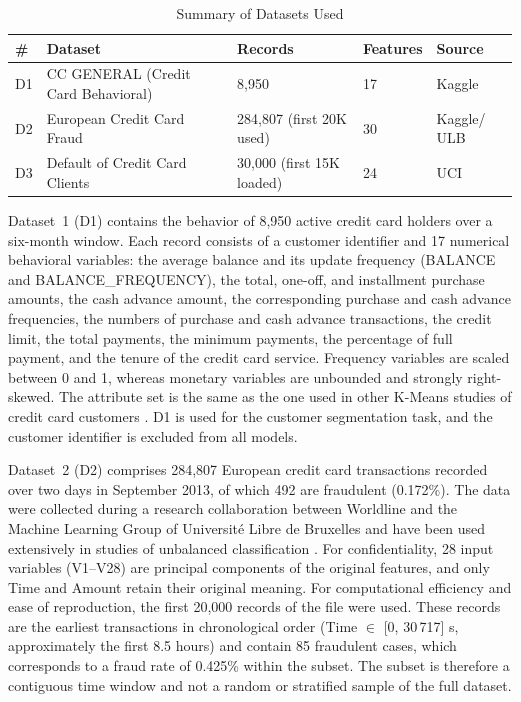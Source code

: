 \documentclass[conference]{IEEEtran}
\begin{document}
\begin{table}[!t]
\centering
\caption{Summary of Datasets Used}
\label{tab:datasets}
\renewcommand{\arraystretch}{1.2}
\begin{tabular}{|p{0.5cm}|p{2.8cm}|p{1.2cm}|p{1cm}|p{1.2cm}|}
\hline
\textbf{\#} & \textbf{Dataset} & \textbf{Records} & \textbf{Features} & \textbf{Source} \\
\hline
D1 & CC GENERAL (Credit Card Behavioral) & 8,950 & 17 & Kaggle \cite{kaggle_ccgeneral} \\
\hline
D2 & European Credit Card Fraud & 284,807 (first 20K used) & 30 & Kaggle/ ULB \cite{kaggle_fraud} \\
\hline
D3 & Default of Credit Card Clients & 30,000 (first 15K loaded) & 24 & UCI \cite{uci_default} \\
\hline
\end{tabular}
\end{table}

Dataset~1 (D1) contains the behavior of 8,950 active credit card holders over a six-month window. Each record consists of a customer identifier and 17 numerical behavioral variables: the average balance and its update frequency (BALANCE and BALANCE\_FREQUENCY), the total, one-off, and installment purchase amounts, the cash advance amount, the corresponding purchase and cash advance frequencies, the numbers of purchase and cash advance transactions, the credit limit, the total payments, the minimum payments, the percentage of full payment, and the tenure of the credit card service. Frequency variables are scaled between 0 and 1, whereas monetary variables are unbounded and strongly right-skewed. The attribute set is the same as the one used in other K-Means studies of credit card customers \cite{gopalakrishnan2024}. D1 is used for the customer segmentation task, and the customer identifier is excluded from all models.

Dataset~2 (D2) comprises 284,807 European credit card transactions recorded over two days in September 2013, of which 492 are fraudulent (0.172\%). The data were collected during a research collaboration between Worldline and the Machine Learning Group of Universit\'{e} Libre de Bruxelles and have been used extensively in studies of unbalanced classification \cite{dal2014learned}. For confidentiality, 28 input variables (V1--V28) are principal components of the original features, and only Time and Amount retain their original meaning. For computational efficiency and ease of reproduction, the first 20,000 records of the file were used. These records are the earliest transactions in chronological order (Time $\in$ [0, 30\,717] s, approximately the first 8.5 hours) and contain 85 fraudulent cases, which corresponds to a fraud rate of 0.425\% within the subset. The subset is therefore a contiguous time window and not a random or stratified sample of the full dataset.
\end{document}
